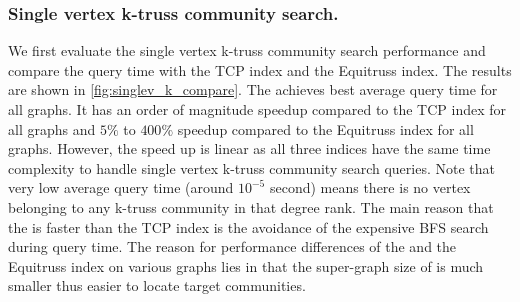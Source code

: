 \subsubsection{Single vertex k-truss community search.}
\label{eval_singlev_k_compare}

We first evaluate the single vertex k-truss community search performance and compare the query time with the TCP index and the Equitruss index. The results are shown in \autoref{fig:singlev_k_compare}. The \twolevelindex{} achieves best average query time for all graphs. It has an order of magnitude speedup compared to the TCP index for all graphs and $5\%$ to $400\%$ speedup compared to the Equitruss index for all graphs. However, the speed up is linear as all three indices have the same time complexity to handle single vertex k-truss community search queries. Note that very low average query time (around $10^{-5}$ second) means there is no vertex belonging to any k-truss community in that degree rank. The main reason that the \twolevelindex{} is faster than the TCP index is the avoidance of the expensive BFS search during query time. The reason for performance differences of the \twolevelindex{} and the Equitruss index on various graphs lies in that the super-graph size of \twolevelindex{} is much smaller thus easier to locate target communities.

